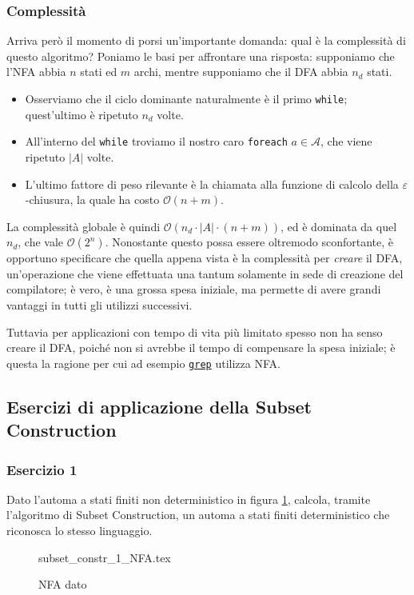 \documentclass[class=book, crop=false, oneside, 12pt]{standalone}
\begin{document}
\subsubsection{Complessità}
Arriva però il momento di porsi un'importante domanda: qual è la complessità di questo algoritmo?
Poniamo le basi per affrontare una risposta: supponiamo che l'NFA abbia \(n\) stati ed \(m\) archi, mentre supponiamo che il DFA abbia \(n_d\) stati.
\begin{itemize}
    \item Osserviamo che il ciclo dominante naturalmente è il primo \texttt{while}; quest'ultimo è ripetuto \(n_d\) volte.
    \item All'interno del \texttt{while} troviamo il nostro caro \texttt{foreach} \(a \in \mathcal{A}\), che viene ripetuto \(|A|\) volte.
    \item L'ultimo fattore di peso rilevante è la chiamata alla funzione di calcolo della \(\varepsilon\)-chiusura, la quale ha costo \(\mathcal{O}(n+m)\).
\end{itemize}
La complessità globale è quindi \( \mathcal{O}(n_d \cdot |A| \cdot (n+m))\), ed è dominata da quel \(n_d\), che vale \(\mathcal{O}(2^n)\). Nonostante questo possa essere oltremodo sconfortante, è opportuno specificare che quella appena vista è la complessità per \emph{creare} il DFA, un'operazione che viene effettuata una tantum solamente in sede di creazione del compilatore; è vero, è una grossa spesa iniziale, ma permette di avere grandi vantaggi in tutti gli utilizzi successivi.

Tuttavia per applicazioni con tempo di vita più limitato spesso non ha senso creare il DFA, poiché non si avrebbe il tempo di compensare la spesa iniziale; è questa la ragione per cui ad esempio \texttt{\href{https://it.wikipedia.org/wiki/Grep}{grep}} utilizza NFA.


\subsection{Esercizi di applicazione della Subset Construction}
\subsubsection*{Esercizio 1}
Dato l'automa a stati finiti non deterministico in figura \ref{es_sc_1}, calcola, tramite l'algoritmo di Subset Construction, un automa a stati finiti deterministico che riconosca lo stesso linguaggio.
\begin{figure}[H]
    \centering
    {subset_constr_1_NFA.tex}
    \caption{NFA dato}
    \label{es_sc_1}
\end{figure}
\end{document}

